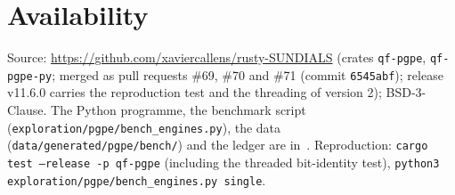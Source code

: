 \documentclass[11pt,a4paper]{article}
\begin{document}
\section{Availability}

Source: \url{https://github.com/xaviercallens/rusty-SUNDIALS} (crates \texttt{qf-pgpe}, \texttt{qf-pgpe-py}; merged as pull requests \#69, \#70 and \#71 (commit \texttt{6545abf}); release v11.6.0 carries the reproduction test and the threading of version 2); BSD-3-Clause. The Python programme, the benchmark script (\texttt{exploration/pgpe/bench\_engines.py}), the data (\texttt{data/generated/pgpe/bench/}) and the ledger are in~\cite{Callens2026sw}. Reproduction: \texttt{cargo test --release -p qf-pgpe} (including the threaded bit-identity test), \texttt{python3 exploration/pgpe/bench\_engines.py single}.



\end{document}
